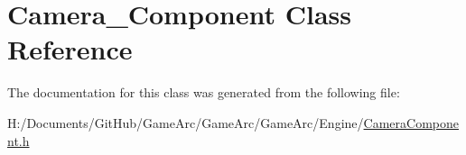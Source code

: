 \hypertarget{class_camera___component}{\section{Camera\+\_\+\+Component Class Reference}
\label{class_camera___component}
}


The documentation for this class was generated from the following file\+:\begin{DoxyCompactItemize}
\item 
H\+:/\+Documents/\+Git\+Hub/\+Game\+Arc/\+Game\+Arc/\+Game\+Arc/\+Engine/\hyperlink{_camera_component_8h}{Camera\+Component.\+h}\end{DoxyCompactItemize}
